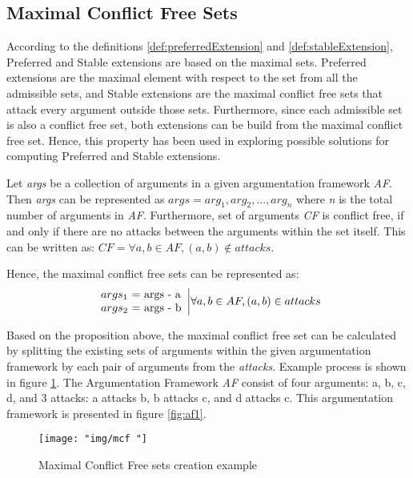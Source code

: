 \subsection{Maximal Conflict Free Sets} \label{section:maxConflictFreeSet}
According to the definitions \ref{def:preferredExtension} and \ref{def:stableExtension}, Preferred and Stable extensions are based on the maximal sets. Preferred extensions are the maximal element with respect to the set from all the admissible sets, and Stable extensions are the maximal conflict free sets that attack every argument outside those sets. Furthermore, since each admissible set is also a conflict free set, both extensions can be build from the maximal conflict free set. Hence, this property has been used in exploring possible solutions for computing Preferred and Stable extensions.

Let \textit{args} be a collection of arguments in a given argumentation framework \textit{AF}. Then \textit{args} can be represented as $args=arg_1, arg_2,...,arg_n$ where \textit{n} is the total number of arguments in \textit{AF}. 
Furthermore, set of arguments \textit{CF} is conflict free, if and only if there are no attacks between the arguments within the set itself. This can be written as: $CF = \forall a,b \in AF, (a, b) \notin attacks$.

Hence, the maximal conflict free sets can be represented as:
\begin{equation}
\begin{array}{lr}
args_1 $ = $ \text{args} $ - $ \text{a} \\
args_2 $ = $ \text{args} $ - $ \text{b} \\
\end{array} \bigg| \forall a, b \in AF, (a,b) \in attacks
\end{equation}

Based on the proposition above, the maximal conflict free set can be calculated by splitting the existing sets of arguments within the given argumentation framework by each pair of arguments from the \textit{attacks}. Example process is shown in figure \ref{fig:mcfExample}. The Argumentation Framework \textit{AF} consist of four arguments: a, b, c, d, and 3 attacks: a attacks b, b attacks c, and d attacks c. This argumentation framework is presented in figure \ref{fig:af1}. 

\begin{figure}[h]
	\centering
	\texttt{[image: "img/mcf "]}
	\caption{Maximal Conflict Free sets creation example}
	\label{fig:mcfExample}
\end{figure}

